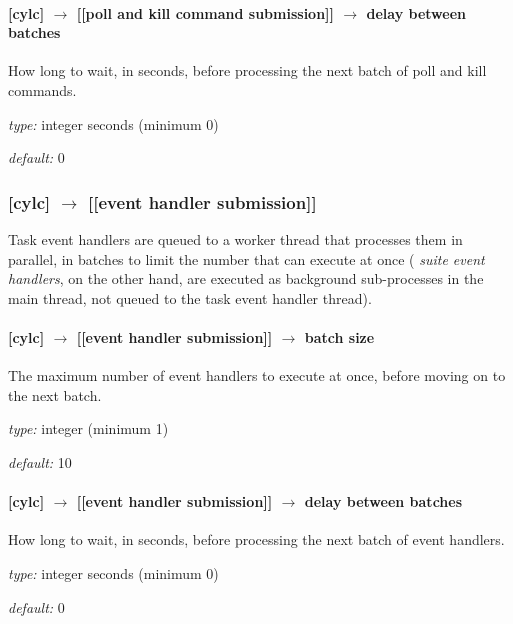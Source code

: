 \paragraph[delay between batches]{[cylc] $\rightarrow$ [[poll and kill command submission]] $\rightarrow$ delay between batches}

How long to wait, in seconds, before processing the next batch of poll and kill commands. 

\begin{myitemize}
    \item {\em type:} integer seconds (minimum 0)
    \item {\em default:} 0
\end{myitemize}


\subsubsection[{[[}event handler submission{]]}]{[cylc] $\rightarrow$ [[event handler submission]]}

Task event handlers are queued to a worker thread that processes them in
parallel, in batches to limit the number that can execute at once ({\em
suite event handlers}, on the other hand, are executed as background
sub-processes in the main thread, not queued to the task
event handler thread).

\paragraph[batch size]{[cylc] $\rightarrow$ [[event handler submission]] $\rightarrow$ batch size}

The maximum number of event handlers to execute at once, before moving
on to the next batch.

\begin{myitemize}
    \item {\em type:} integer (minimum 1)
    \item {\em default:} 10
\end{myitemize}

\paragraph[delay between batches]{[cylc] $\rightarrow$ [[event handler submission]] $\rightarrow$ delay between batches}

How long to wait, in seconds, before processing the next batch of event handlers. 

\begin{myitemize}
    \item {\em type:} integer seconds (minimum 0)
    \item {\em default:} 0
\end{myitemize}


